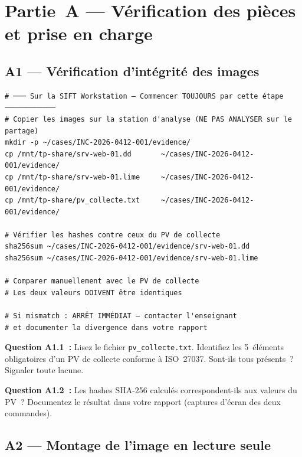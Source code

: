 \section{Partie~A — Vérification des pièces et prise en charge}
\label{lab2:partieA}

\subsection{A1 — Vérification d'intégrité des images}

\begin{lstlisting}[style=StyleTerminal,
  caption={Vérification d'intégrité avant toute analyse},
  label={lst:lab2-hash-verify}]
# ─── Sur la SIFT Workstation — Commencer TOUJOURS par cette étape ────────────
# Copier les images sur la station d'analyse (NE PAS ANALYSER sur le partage)
mkdir -p ~/cases/INC-2026-0412-001/evidence/
cp /mnt/tp-share/srv-web-01.dd       ~/cases/INC-2026-0412-001/evidence/
cp /mnt/tp-share/srv-web-01.lime     ~/cases/INC-2026-0412-001/evidence/
cp /mnt/tp-share/pv_collecte.txt     ~/cases/INC-2026-0412-001/evidence/

# Vérifier les hashes contre ceux du PV de collecte
sha256sum ~/cases/INC-2026-0412-001/evidence/srv-web-01.dd
sha256sum ~/cases/INC-2026-0412-001/evidence/srv-web-01.lime

# Comparer manuellement avec le PV de collecte
# Les deux valeurs DOIVENT être identiques

# Si mismatch : ARRÊT IMMÉDIAT — contacter l'enseignant
# et documenter la divergence dans votre rapport
\end{lstlisting}

\begin{boxexo}
\textbf{Question A1.1~:} Lisez le fichier \texttt{pv\_collecte.txt}.
Identifiez les 5~éléments obligatoires d'un PV de collecte conforme
à ISO~27037. Sont-ils tous présents~? Signaler toute lacune.

\medskip\textbf{Question A1.2~:} Les hashes SHA-256 calculés
correspondent-ils aux valeurs du PV~? Documentez le résultat dans
votre rapport (captures d'écran des deux commandes).
\end{boxexo}

\subsection{A2 — Montage de l'image en lecture seule}

